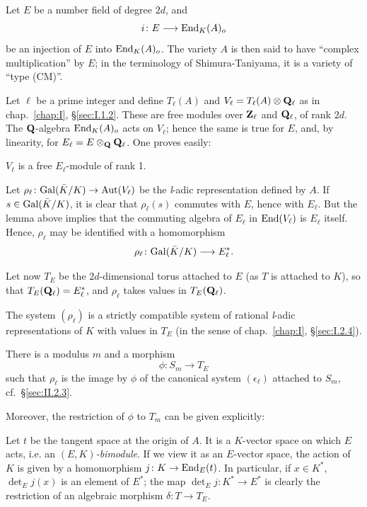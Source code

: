 Let $E$ be a number field of degree $2d$, and
\[
i\colon E \longrightarrow \mathrm{End}_K(A)_o
\]
be an injection of $E$ into $\mathrm{End}_K(A)_o$.  The variety $A$ is then said
to have ``complex multiplication'' by $E$; in the terminology of
Shimura-Taniyama, it is a variety of ``type (CM)''.

Let $\ell$ be a prime integer and define $T_\ell(A)$ and
$V_\ell = T_\ell(A) \mathbin{\otimes} \mathbf{Q}_\ell$ as in chap.~\ref{chap:I},
\S\ref{sec:I.1.2}.  These are free modules over $\mathbf{Z}_\ell$ and
$\mathbf{Q}_\ell$, of rank $2d$.  The $\mathbf{Q}$-algebra $\mathrm{End}_K(A)_o$ acts on
$V_\ell$; hence the same is true for $E$, and, by linearity, for
$E_\ell = E \mathbin{\otimes}_{\mathbf{Q}} \mathbf{Q}_\ell$.  One proves easily:

\begin{lemma}
$V_\ell$ is a free $E_\ell$-module of rank 1.
\end{lemma}

Let $\rho_\ell\colon \mathrm{Gal}(\bar{K}/K) \to \mathrm{Aut}(V_\ell)$ be the
\textit{l}-adic representation defined by $A$.  If
$s \in \mathrm{Gal}(\bar{K}/K)$, it is clear that $\rho_\ell(s)$ commutes with
$E$, hence with $E_\ell$.  But the lemma above implies that the
commuting algebra of $E_\ell$ in $\mathrm{End}(V_\ell)$ is $E_\ell$ itself.
Hence, $\rho_\ell$ may be identified with a homomorphism
\[
\rho_\ell\colon \mathrm{Gal}(\bar{K}/K) \longrightarrow E_\ell^*.
\]

Let now $T_E$ be the $2d$-dimensional torus attached to $E$ (as $T$ is
attached to $K$), so that $T_E(\mathbf{Q}_\ell) = E_\ell^*$, and $\rho_\ell$
takes values in $T_E(\mathbf{Q}_\ell)$.

\begin{theorem}[1]\label{thm:II.2.8.1}
\begin{alist}
\item The system $(\rho_\ell)$ is a strictly compatible system of
rational \textit{l}-adic representations of $K$ with values in $T_E$
(in the sense of chap.~\ref{chap:I}, \S\ref{sec:I.2.4}).
\item There is a modulus $m$ and a morphism
\[
\phi\colon S_m \longrightarrow T_E
\]
such that $\rho_\ell$ is the image by $\phi$ of the canonical system
$(\epsilon_\ell)$ attached to $S_m$, cf.~\S\ref{sec:II.2.3}.
\end{alist}
\end{theorem}

Moreover, the restriction of $\phi$ to $T_m$ can be given explicitly:

Let $t$ be the tangent space at the origin of $A$.  It is a $K$-vector
space on which $E$ acts, i.e.  an \emph{$(E,K)$-bimodule}.  If we view
it as an $E$-vector space, the action of $K$ is given by a homomorphism
$j\colon K \to \mathrm{End}_E(t)$.  In particular, if $x \in K^*$,
$\det\nolimits_E j(x)$ is an element of $E^*$; the map
$\det\nolimits_E j\colon K^* \to E^*$ is clearly the restriction of an
algebraic morphism $\delta\colon T \to T_E$.

